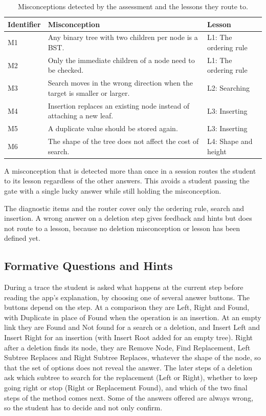 \begin{table}[H]
\centering
\small
\caption{Misconceptions detected by the assessment and the lessons they route to.}
\label{tab:routing}
\begin{tabularx}{\textwidth}{p{2.6cm} X p{3.4cm}}
\toprule
Identifier & Misconception & Lesson \\
\midrule
M1 & Any binary tree with two children per node is a BST. & L1: The ordering rule \\
M2 & Only the immediate children of a node need to be checked. & L1: The ordering rule \\
M3 & Search moves in the wrong direction when the target is smaller or larger. & L2: Searching \\
M4 & Insertion replaces an existing node instead of attaching a new leaf. & L3: Inserting \\
M5 & A duplicate value should be stored again. & L3: Inserting \\
M6 & The shape of the tree does not affect the cost of search. & L4: Shape and height \\
\bottomrule
\end{tabularx}
\end{table}

A misconception that is detected more than once in a session routes the student to its lesson regardless of the other answers. This avoids a student passing the gate with a single lucky answer while still holding the misconception.

The diagnostic items and the router cover only the ordering rule, search and insertion. A wrong answer on a deletion step gives feedback and hints but does not route to a lesson, because no deletion misconception or lesson has been defined yet.

\subsection{Formative Questions and Hints}
During a trace the student is asked what happens at the current step before reading the app's explanation, by choosing one of several answer buttons. The buttons depend on the step. At a comparison they are Left, Right and Found, with Duplicate in place of Found when the operation is an insertion. At an empty link they are Found and Not found for a search or a deletion, and Insert Left and Insert Right for an insertion (with Insert Root added for an empty tree). Right after a deletion finds its node, they are Remove Node, Find Replacement, Left Subtree Replaces and Right Subtree Replaces, whatever the shape of the node, so that the set of options does not reveal the answer. The later steps of a deletion ask which subtree to search for the replacement (Left or Right), whether to keep going right or stop (Right or Replacement Found), and which of the two final steps of the method comes next. Some of the answers offered are always wrong, so the student has to decide and not only confirm.


